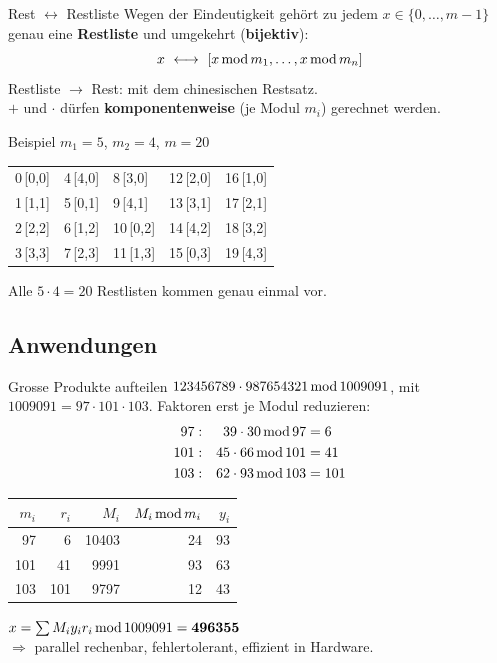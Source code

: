 \documentclass[a4paper, fontsize=7pt]{scrartcl}
\newcommand{\Mod}{\mskip3mu\mathrm{mod}\mskip3mu}
\renewcommand*{\arraystretch}{1.5}  %
\begin{document}
\begin{mainbox}{Rest $\leftrightarrow$ Restliste}
Wegen der Eindeutigkeit gehört zu jedem $x \in \{0, \ldots, m-1\}$ genau
eine \textbf{Restliste} und umgekehrt (\textbf{bijektiv}):
$$x \ \longleftrightarrow\ [x \Mod m_1, \ldots, x \Mod m_n]$$
Restliste $\to$ Rest: mit dem chinesischen Restsatz.\\
$+$ und $\cdot$ dürfen \textbf{komponentenweise} (je Modul $m_i$)
gerechnet werden.
\end{mainbox}

\begin{subbox}{Beispiel $m_1 = 5$, $m_2 = 4$, $m = 20$}
\renewcommand*{\arraystretch}{1.05}
\begin{center}
\setlength{\tabcolsep}{3pt}
\begin{tabular}{@{}lllll@{}}
0\,[0,0] & 4\,[4,0] & 8\,[3,0] & 12\,[2,0] & 16\,[1,0] \\
1\,[1,1] & 5\,[0,1] & 9\,[4,1] & 13\,[3,1] & 17\,[2,1] \\
2\,[2,2] & 6\,[1,2] & 10\,[0,2] & 14\,[4,2] & 18\,[3,2] \\
3\,[3,3] & 7\,[2,3] & 11\,[1,3] & 15\,[0,3] & 19\,[4,3] \\
\end{tabular}
\end{center}
Alle $5 \cdot 4 = 20$ Restlisten kommen genau einmal vor.
\end{subbox}

\subsection{Anwendungen}

\begin{subbox}{Grosse Produkte aufteilen}
$123456789 \cdot 987654321 \Mod 1009091$, mit
$1009091 = 97 \cdot 101 \cdot 103$. Faktoren erst je Modul reduzieren:
\begin{align*}
97&: & 39 \cdot 30 \Mod 97 &= 6\\
101&: & 45 \cdot 66 \Mod 101 &= 41\\
103&: & 62 \cdot 93 \Mod 103 &= 101
\end{align*}
\renewcommand*{\arraystretch}{1.1}
\begin{center}
\setlength{\tabcolsep}{4pt}
\begin{tabular}{@{}rr|rrr@{}}
$m_i$ & $r_i$ & $M_i$ & $M_i \Mod m_i$ & $y_i$ \\
\hline
97 & 6 & 10403 & 24 & 93 \\
101 & 41 & 9991 & 93 & 63 \\
103 & 101 & 9797 & 12 & 43 \\
\end{tabular}
\end{center}
$x = \sum M_i y_i r_i \Mod 1009091 = \mathbf{496355}$\\
$\Rightarrow$ parallel rechenbar, fehlertolerant, effizient in Hardware.
\end{subbox}
\end{document}
